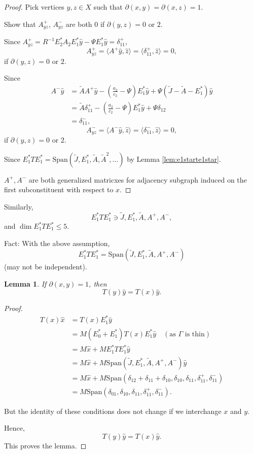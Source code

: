 \documentclass[
]{book}
\newtheorem{lemma}{Lemma}[chapter]
\theoremstyle{definition}
\theoremstyle{definition}
\theoremstyle{definition}
\theoremstyle{definition}
\theoremstyle{remark}
\begin{document}
\begin{proof}
Pick vertices \(y,z\in X\) such that \(\partial(x,y) = \partial(x,z) = 1\).

Show that \(A^+_{yz}\), \(A^-_{yz}\) are both \(0\) if \(\partial(y,z) = 0\) or \(2\).

Since \(A^+_{yz} = R^{-1}E^*_2A_2E^*_1\hat{y} - \Psi E^*_1\hat{y} = \delta^+_{11}\),
\[A^+_{yz} = \langle A^+\hat{y}, \hat{z}\rangle = \langle \delta^+_{11},\hat{z}\rangle = 0,\]
if \(\partial(y,z) = 0\) or \(2\).

Since
\begin{align}
A^-\hat{y} & = \tilde{A}A^+\hat{y} - \left(\frac{a_2}{c_2}-\Psi\right)E^*_1\hat{y} + \Psi(\tilde{J} - \tilde{A} - E^*_1)\hat{y}\\
& = \tilde{A}\delta^+_{11} - \left(\frac{a_2}{c_2}-\Psi\right)E^*_1\hat{y} + \Psi\delta_{12}\\
& = \delta^-_{11},
\end{align}
\[A^-_{yz} = \langle A^-\hat{y}, \hat{z}\rangle = \langle \delta^-_{11}, \hat{z}\rangle = 0,\]
if \(\partial(y,z) = 0\) or \(2\).

Since \(E^*_1TE^*_1 = \mathrm{Span}(\tilde{J},E^*_1, \tilde{A}, \tilde{A}^2, \ldots)\) by Lemma \ref{lem:e1starte1star}.

\(A^+, A^-\) are both generalized matricxes for adjacency subgraph induced on the first subconstituent with respect to \(x\).
\end{proof}

Similarly,
\[E^*_1TE^*_1 \ni \tilde{J}, E^*_1, \tilde{A}, A^+, A^-,\]
and \(\dim E^*_1TE^*_1 \leq 5\).

Fact: With the above assumption,
\[E^*_1TE^*_1 = \mathrm{Span}(\tilde{J}, E^*_1, \tilde{A}, A^+, A^-)\]
(may not be independent).

\begin{lemma}
\protect\hypertarget{lem:tyx-equals-txy}{}\label{lem:tyx-equals-txy}If \(\partial(x,y) = 1\), then
\[T(y)\hat{y} = T(x)\hat{y}.\]
\end{lemma}

\begin{proof}
\begin{align}
T(x)\hat{x} & = T(x)E^*_1\hat{y}\\
& = M(E^*_0+E^*_1)T(x)E^*_1\hat{y} \quad (\text{as $\Gamma$ is thin})\\
& = M\hat{x} + ME^*_1TE^*_1\hat{y}\\
& = M\hat{x} + M\mathrm{Span}(\tilde{J}, E^*_1, \tilde{A}, A^+, A^-)\hat{y}\\
& = M\hat{x} + M\mathrm{Span}(\delta_{12}+\delta_{11}+\delta_{10}, \delta_{10}, \delta_{11}, \delta^+_{11}, \delta^-_{11})\\
& = M\mathrm{Span}(\delta_{01}, \delta_{10}, \delta_{11}, \delta^+_{11}, \delta^-_{11}).
\end{align}

But the identity of these conditions does not change if we interchange \(x\) and \(y\).

Hence,
\[T(y)\hat{y} = T(x)\hat{y}.\]
This proves the lemma.
\end{proof}
\end{document}
